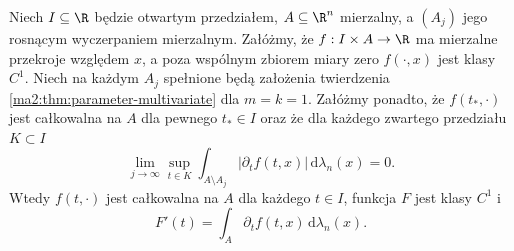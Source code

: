 \begin{stwierdzenie}
\label{ma2:prop:parameter-derivative-tails}
Niech $I\subseteq\R$ będzie otwartym
przedziałem, $A\subseteq\R^n$ mierzalny,
a $(A_j)$ jego rosnącym wyczerpaniem
mierzalnym. Załóżmy, że $f:I\times A\to\R$
ma mierzalne przekroje względem $x$,
a poza wspólnym zbiorem miary zero
$f(\cdot,x)$ jest klasy $C^1$.
Niech na każdym $A_j$ spełnione będą
założenia twierdzenia
\ref{ma2:thm:parameter-multivariate}
dla $m=k=1$. Załóżmy ponadto, że
$f(t_*,\cdot)$ jest całkowalna na $A$
dla pewnego $t_*\in I$ oraz że dla każdego
zwartego przedziału $K\subset I$
\[
 \lim_{j\to\infty}\sup_{t\in K}
 \int_{A\setminus A_j}
 |\partial_t f(t,x)|\,\mathrm d\lambda_n(x)=0.
\]
Wtedy $f(t,\cdot)$ jest całkowalna na $A$
dla każdego $t\in I$, funkcja $F$
jest klasy $C^1$ i
\[
 F'(t)=\int_A\partial_t f(t,x)\,
                   \mathrm d\lambda_n(x).
\]
\end{stwierdzenie}

